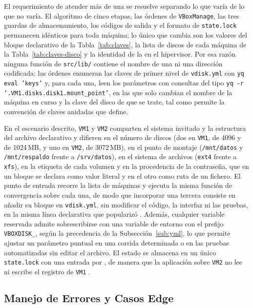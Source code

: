 El requerimiento de atender más de una \vm{} se resuelve separando lo que varía de lo que no varía. El algoritmo de cinco etapas, las órdenes de \texttt{VBoxManage}, las tres guardas de almacenamiento, los códigos de salida y el formato de \texttt{state.lock} permanecen idénticos para toda máquina; lo único que cambia son los valores del bloque declarativo de la Tabla~\ref{tab:claves}, la lista de discos de cada máquina de la Tabla~\ref{tab:claves-disco} y la identidad de la \vm{} en el hipervisor. Por esa razón ninguna función de \texttt{src/lib/} contiene el nombre de una \vm{} ni una dirección codificada: las órdenes enumeran las claves de primer nivel de \texttt{vdisk.yml} con \texttt{yq eval 'keys'} y, para cada una, leen los parámetros con consultas del tipo \texttt{yq -r '.VM1.disks.disk1.mount\_point'}, en las que solo cambian el nombre de la máquina en curso y la clave del disco de que se trate, tal como permite la convención de claves anidadas que \textcite{yaml_spec} define.

En el escenario descrito, \texttt{VM1} y \texttt{VM2} comparten el sistema invitado y la estructura del archivo declarativo y difieren en el número de discos (dos en \texttt{VM1}, de 4096 y de 1024\,MB, y uno en \texttt{VM2}, de 3072\,MB), en el punto de montaje (\texttt{/mnt/datos} y \texttt{/mnt/respaldo} frente a \texttt{/srv/datos}), en el sistema de archivos (\texttt{ext4} frente a \texttt{xfs}), en la etiqueta de cada volumen y en la procedencia de la contraseña, que en un bloque se declara como valor literal y en el otro como ruta de un fichero. El punto de entrada recorre la lista de máquinas y ejecuta la misma función de convergencia sobre cada una, de modo que incorporar una tercera \vm{} consiste en añadir su bloque en \texttt{vdisk.yml}, sin modificar el código, la interfaz ni las pruebas, en la misma línea declarativa que \textcite{terraform} popularizó \parencite{bash_best_practices}. Además, cualquier variable reservada admite sobrescribirse con una variable de entorno con el prefijo \texttt{VBOXDISK\_}, según la precedencia de la Subsección~\ref{sub:yml}, lo que permite ajustar un parámetro puntual en una corrida determinada o en las pruebas automatizadas sin editar el archivo. El estado se almacena en un único \texttt{state.lock} con una entrada por \vm{}, de manera que la aplicación sobre \texttt{VM2} no lee ni escribe el registro de \texttt{VM1} \parencite{xdg_spec}.

\subsection{Manejo de Errores y Casos Edge}
\label{sub:errores}

